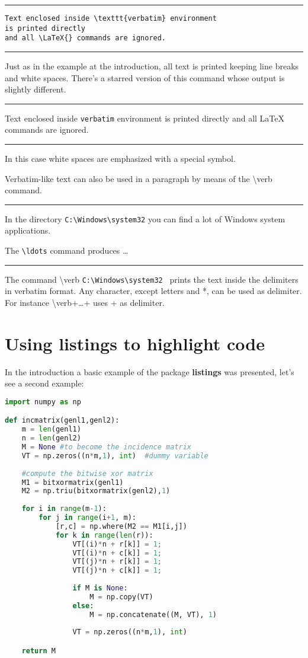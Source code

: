 \vspace{1em} \noindent \hrule
\begin{verbatim}
Text enclosed inside \texttt{verbatim} environment 
is printed directly 
and all \LaTeX{} commands are ignored.
\end{verbatim}
\noindent \hrule \vspace{1em}

Just as in the example at the introduction, all text is printed keeping line breaks and white spaces. There's a starred version of this command whose output is slightly different.

\vspace{1em} \noindent \hrule
\begin{verbatim*}
Text enclosed inside \texttt{verbatim} environment 
is printed directly 
and all \LaTeX{} commands are ignored.
\end{verbatim*}
\noindent \hrule \vspace{1em} 

In this case white spaces are emphasized with a special symbol.

Verbatim-like text can also be used in a paragraph by means of the \textbackslash verb command.

\vspace{1em} \noindent \hrule
In the directory \verb|C:\Windows\system32| you can find a lot of Windows 
system applications. 

The \verb+\ldots+ command produces \ldots
\noindent \hrule \vspace{1em} 

The command \textbackslash verb \textbar \verb|C:\Windows\system32| \textbar~prints the text inside the delimiters \textbar in verbatim format. Any character, except letters and *, can be used as delimiter. For instance \textbackslash verb+\ldots+ uses + as delimiter.

\section{Using listings to highlight code}
In the introduction a basic example of the package \textbf{listings} was presented, let's see a second example:

\begin{lstlisting}[language=Python]
import numpy as np

def incmatrix(genl1,genl2):
	m = len(genl1)
	n = len(genl2)
	M = None #to become the incidence matrix
	VT = np.zeros((n*m,1), int)  #dummy variable
	
	#compute the bitwise xor matrix
	M1 = bitxormatrix(genl1)
	M2 = np.triu(bitxormatrix(genl2),1) 
	
	for i in range(m-1):
		for j in range(i+1, m):
			[r,c] = np.where(M2 == M1[i,j])
			for k in range(len(r)):
				VT[(i)*n + r[k]] = 1;
				VT[(i)*n + c[k]] = 1;
				VT[(j)*n + r[k]] = 1;
				VT[(j)*n + c[k]] = 1;
				
				if M is None:
					M = np.copy(VT)
				else:
					M = np.concatenate((M, VT), 1)
				
				VT = np.zeros((n*m,1), int)

	return M
\end{lstlisting}

